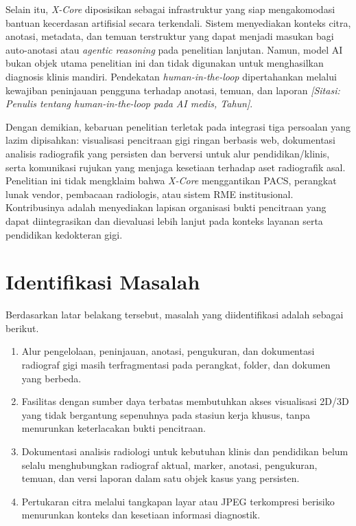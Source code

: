 \documentclass[12pt,a4paper,oneside]{report}
\newcommand{\sitasi}[1]{\textit{[Sitasi: #1]}}
\newcommand{\xcore}{\textit{X-Core}}
\begin{document}
Selain itu, \xcore{} diposisikan sebagai infrastruktur yang siap mengakomodasi bantuan kecerdasan artifisial secara terkendali. Sistem menyediakan konteks citra, anotasi, metadata, dan temuan terstruktur yang dapat menjadi masukan bagi auto-anotasi atau \textit{agentic reasoning} pada penelitian lanjutan. Namun, model AI bukan objek utama penelitian ini dan tidak digunakan untuk menghasilkan diagnosis klinis mandiri. Pendekatan \textit{human-in-the-loop} dipertahankan melalui kewajiban peninjauan pengguna terhadap anotasi, temuan, dan laporan \sitasi{Penulis tentang human-in-the-loop pada AI medis, Tahun}.

Dengan demikian, kebaruan penelitian terletak pada integrasi tiga persoalan yang lazim dipisahkan: visualisasi pencitraan gigi ringan berbasis web, dokumentasi analisis radiografik yang persisten dan berversi untuk alur pendidikan/klinis, serta komunikasi rujukan yang menjaga kesetiaan terhadap aset radiografik asal. Penelitian ini tidak mengklaim bahwa \xcore{} menggantikan PACS, perangkat lunak vendor, pembacaan radiologis, atau sistem RME institusional. Kontribusinya adalah menyediakan lapisan organisasi bukti pencitraan yang dapat diintegrasikan dan dievaluasi lebih lanjut pada konteks layanan serta pendidikan kedokteran gigi.

\section{Identifikasi Masalah}

Berdasarkan latar belakang tersebut, masalah yang diidentifikasi adalah sebagai berikut.
\begin{enumerate}[label=\arabic*.]
  \item Alur pengelolaan, peninjauan, anotasi, pengukuran, dan dokumentasi radiograf gigi masih terfragmentasi pada perangkat, folder, dan dokumen yang berbeda.
  \item Fasilitas dengan sumber daya terbatas membutuhkan akses visualisasi 2D/3D yang tidak bergantung sepenuhnya pada stasiun kerja khusus, tanpa menurunkan keterlacakan bukti pencitraan.
  \item Dokumentasi analisis radiologi untuk kebutuhan klinis dan pendidikan belum selalu menghubungkan radiograf aktual, marker, anotasi, pengukuran, temuan, dan versi laporan dalam satu objek kasus yang persisten.
  \item Pertukaran citra melalui tangkapan layar atau JPEG terkompresi berisiko menurunkan konteks dan kesetiaan informasi diagnostik.
\end{enumerate}
\end{document}

